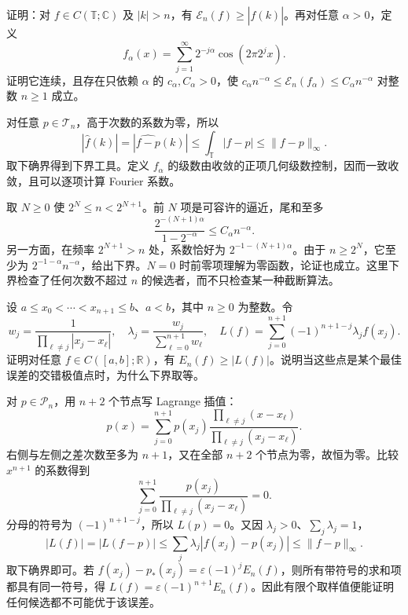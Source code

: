 \begin{exercise}[可精确判断量级的逼近率]\label{b2:ex:approximation-lacunary-rate}
证明：对 \(f\in C(\mathbb T;\mathbb C)\) 及 \(|k|>n\)，有 \(\mathcal E_n(f)\geq|\widehat f(k)|\)。再对任意 \(\alpha>0\)，定义
\[
 f_\alpha(x)=\sum_{j=1}^\infty2^{-j\alpha}\cos(2\pi2^jx).
\]
证明它连续，且存在只依赖 \(\alpha\) 的 \(c_\alpha,C_\alpha>0\)，使 \(c_\alpha n^{-\alpha}\leq\mathcal E_n(f_\alpha)\leq C_\alpha n^{-\alpha}\) 对整数 \(n\geq1\) 成立。
\end{exercise}
\begin{solution}
对任意 \(p\in\mathcal T_n\)，高于次数的系数为零，所以
\[
 |\widehat f(k)|=|\widehat{f-p}(k)|
 \leq\int_{\mathbb T}|f-p|\leq\|f-p\|_\infty.
\]
取下确界得到下界工具。定义 \(f_\alpha\) 的级数由收敛的正项几何级数控制，因而一致收敛，且可以逐项计算 Fourier 系数。

取 \(N\geq0\) 使 \(2^N\leq n<2^{N+1}\)。前 \(N\) 项是可容许的逼近，尾和至多
\[
 \frac{2^{-(N+1)\alpha}}{1-2^{-\alpha}}\leq C_\alpha n^{-\alpha}.
\]
另一方面，在频率 \(2^{N+1}>n\) 处，系数恰好为 \(2^{-1-(N+1)\alpha}\)。由于 \(n\geq2^N\)，它至少为 \(2^{-1-\alpha}n^{-\alpha}\)，给出下界。\(N=0\) 时前零项理解为零函数，论证也成立。这里下界检查了任何次数不超过 \(n\) 的候选者，而不只检查某一种截断算法。
\end{solution}

\begin{exercise}[节点值给出的误差下界]\label{b2:ex:approximation-dual-certificate}
设 \(a\leq x_0<\cdots<x_{n+1}\leq b\)、\(a<b\)，其中 \(n\geq0\) 为整数。令
\[
 w_j=\frac1{\prod_{\ell\ne j}|x_j-x_\ell|},\quad
 \lambda_j=\frac{w_j}{\sum_{\ell=0}^{n+1}w_\ell},\quad
 L(f)=\sum_{j=0}^{n+1}(-1)^{n+1-j}\lambda_j f(x_j).
\]
证明对任意 \(f\in C([a,b];\mathbb R)\)，有 \(E_n(f)\geq|L(f)|\)。说明当这些点是某个最佳误差的交错极值点时，为什么下界取等。
\end{exercise}
\begin{solution}
对 \(p\in\mathcal P_n\)，用 \(n+2\) 个节点写 Lagrange 插值：
\[
 p(x)=\sum_{j=0}^{n+1}p(x_j)
 \frac{\prod_{\ell\ne j}(x-x_\ell)}{\prod_{\ell\ne j}(x_j-x_\ell)}.
\]
右侧与左侧之差次数至多为 \(n+1\)，又在全部 \(n+2\) 个节点为零，故恒为零。比较 \(x^{n+1}\) 的系数得到
\[
 \sum_{j=0}^{n+1}\frac{p(x_j)}{\prod_{\ell\ne j}(x_j-x_\ell)}=0.
\]
分母的符号为 \((-1)^{n+1-j}\)，所以 \(L(p)=0\)。又因 \(\lambda_j>0\)、\(\sum_j\lambda_j=1\)，
\[
 |L(f)|=|L(f-p)|\leq\sum_j\lambda_j|f(x_j)-p(x_j)|
 \leq\|f-p\|_\infty.
\]
取下确界即可。若 \(f(x_j)-p_*(x_j)=\varepsilon(-1)^jE_n(f)\)，则所有带符号的求和项都具有同一符号，得 \(L(f)=\varepsilon(-1)^{n+1}E_n(f)\)。因此有限个取样值便能证明任何候选都不可能优于该误差。
\end{solution}

